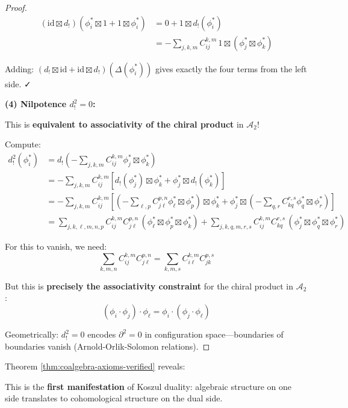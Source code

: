 \begin{proof}
\begin{align*}
(\mathrm{id} \boxtimes d_!)(\phi_i^* \boxtimes 1 + 1 \boxtimes \phi_i^*) &= 0 + 1 \boxtimes d_!(\phi_i^*) \\
&= -\sum_{j,k,m} C_{ij}^{k,m} \, 1 \boxtimes (\phi_j^* \boxtimes \phi_k^*)
\end{align*}

Adding: $(d_! \boxtimes \mathrm{id} + \mathrm{id} \boxtimes d_!)(\Delta(\phi_i^*))$ gives exactly the four terms from the left side. ✓

\medskip
\noindent\textbf{(4) Nilpotence $d_!^2 = 0$:}

This is \textbf{equivalent to associativity of the chiral product} in $\mathcal{A}_2$!

Compute:
\begin{align*}
d_!^2(\phi_i^*) &= d_!\left(-\sum_{j,k,m} C_{ij}^{k,m} \phi_j^* \boxtimes \phi_k^*\right) \\
&= -\sum_{j,k,m} C_{ij}^{k,m} [d_!(\phi_j^*) \boxtimes \phi_k^* + \phi_j^* \boxtimes d_!(\phi_k^*)] \\
&= -\sum_{j,k,m} C_{ij}^{k,m} \left[\left(-\sum_{\ell,p} C_{j\ell}^{p,n} \phi_\ell^* \boxtimes \phi_p^*\right) \boxtimes \phi_k^* + \phi_j^* \boxtimes \left(-\sum_{q,r} C_{kq}^{r,s} \phi_q^* \boxtimes \phi_r^*\right)\right] \\
&= \sum_{j,k,\ell,m,n,p} C_{ij}^{k,m} C_{j\ell}^{p,n} \,(\phi_\ell^* \boxtimes \phi_p^* \boxtimes \phi_k^*) + \sum_{j,k,q,m,r,s} C_{ij}^{k,m} C_{kq}^{r,s} \,(\phi_j^* \boxtimes \phi_q^* \boxtimes \phi_r^*)
\end{align*}

For this to vanish, we need:
$$\boxed{\sum_{k,m,n} C_{ij}^{k,m} C_{j\ell}^{p,n} = \sum_{k,m,s} C_{i\ell}^{k,m} C_{jk}^{p,s}}$$

But this is \textbf{precisely the associativity constraint} for the chiral product in $\mathcal{A}_2$:
$$(\phi_i \cdot \phi_j) \cdot \phi_\ell = \phi_i \cdot (\phi_j \cdot \phi_\ell)$$

Geometrically: $d_!^2 = 0$ encodes $\partial^2 = 0$ in configuration space---boundaries of boundaries vanish (Arnold-Orlik-Solomon relations).
\end{proof}

\begin{remark}
Theorem \ref{thm:coalgebra-axioms-verified} reveals:
\begin{center}
\end{center}

This is the \textbf{first manifestation} of Koszul duality: algebraic structure on one side translates to cohomological structure on the dual side.
\end{remark}

